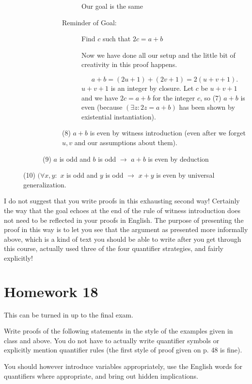 \documentclass[12pt]{article}
\begin{document}
\begin{description}
\begin{description}
\begin{description}
\begin{description}
Our goal is the same

\item[Reminder of Goal:]  Find $c$ such that $2c=a+b$

Now we have done all our setup and the little bit of creativity in this proof happens.

$$a+b = (2u+1) + (2v+1) = 2(u+v+1).$$  $u+v+1$ is an integer by closure.  Let $c$ be $u+v+1$ and we have
$2c=a+b$ for the integer $c$, so (7) $a+b$ is even (because $(\exists z:2z=a+b)$ has been shown by existential instantiation).

\end{description}
(8) $a+b$ is even by witness introduction (even after we forget $u,v$ and our assumptions about them).
\end{description}
(9)  $a$ is odd and $b$ is odd $\rightarrow$  $a+b$ is even by deduction
\end{description}
(10) $(\forall x,y:$ $x$ is odd and $y$ is odd $\rightarrow$ $x+y$ is even by universal generalization.

\end{description}

I do not suggest that you write proofs in this exhausting second way!  Certainly the way that the goal echoes at the end of the rule of witness introduction does not need to be reflected in your proofs in English.  The purpose of presenting the proof in this way is to let you see that the argument as presented more informally above, which is a kind of text you should be able to write after you get through this course, actually used three of the four quantifier strategies, and fairly explicitly!

\section{Homework 18}

This can be turned in up to the final exam.

Write proofs of the following statements in the style of the examples given in class and above.  You do not have to actually write quantifier symbols or explicitly mention quantifier rules (the first style of proof given on p. 48  is fine).

You should however introduce variables appropriately, use the English words for quantifiers where appropriate, and bring out hidden implications.
\end{document}
